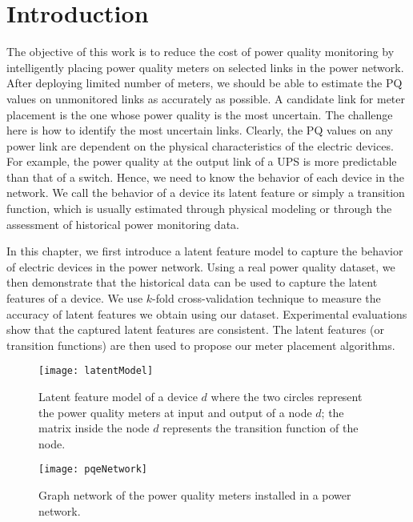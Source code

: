 \label{chap:latentF}
\section{Introduction}
The objective of this work is to reduce the cost of power quality monitoring by intelligently placing power quality meters on selected links in the power network. After deploying limited number of meters, we should be able to estimate the PQ values on unmonitored links as accurately as possible. A candidate link for meter placement is the one whose power quality is the most uncertain. The challenge here is how to identify the most uncertain links. Clearly, the PQ values on any power link are dependent on the physical characteristics of the electric devices. For example, the power quality at the output link of a UPS is more predictable than that of a switch. Hence, we need to know the behavior of each device in the network. We call the behavior of a device its latent feature or simply a transition function, which is usually estimated through physical modeling or through the assessment of historical power monitoring data.

In this chapter, we first introduce a latent feature model to capture the behavior of electric devices in the power network. Using a real power quality dataset, we then demonstrate that the historical data can be used to capture the latent features of a device. We use $k$-fold cross-validation technique to measure the accuracy of latent features we obtain using our dataset. Experimental evaluations show that the captured latent features are consistent. The latent features (or transition functions) are then used to propose our meter placement algorithms.

\begin{figure}[!p]
\center
\texttt{[image: latentModel]}
\caption{Latent feature model of a device $d$ where the two circles represent the power quality meters at input and output of a node $d$; the matrix inside the node $d$ represents the transition function of the node.}
\label{fig:latentModel}

\end{figure}

\begin{figure}[!p]
\center
\texttt{[image: pqeNetwork]}
\caption{Graph network of the power quality meters installed in a power network.}
\label{fig:pqeNetwork}
\vspace{3cm}
\end{figure}

